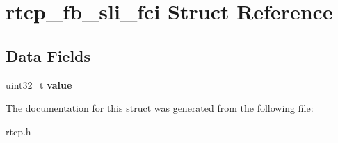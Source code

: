\section{rtcp\+\_\+fb\+\_\+sli\+\_\+fci Struct Reference}
\label{structrtcp__fb__sli__fci}
\subsection*{Data Fields}
\begin{DoxyCompactItemize}
\item 
\mbox{\label{structrtcp__fb__sli__fci_a8e69918ca155dcdd0188951d936226e2}} 
uint32\+\_\+t {\bfseries value}
\end{DoxyCompactItemize}


The documentation for this struct was generated from the following file\+:\begin{DoxyCompactItemize}
\item 
rtcp.\+h\end{DoxyCompactItemize}
